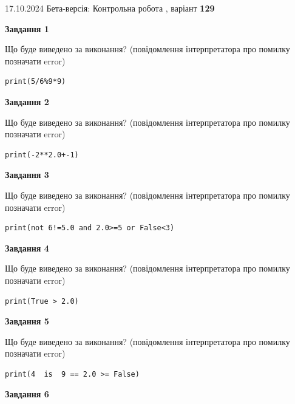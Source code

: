 \documentclass[12pt, ukrainian]{article}
\begin{document}
{\Large{17.10.2024 Бета-версія: Контрольна робота , варіант  \No \textbf { 129 }\par}}
{
\begin {large}
{\begin {center}\textbf{Завдання 1}\end {center}}

Що буде виведено за виконання? (повідомлення інтерпретатора про помилку позначати error)\par
\begin{verbatim}
print(5/6%9*9)
\end{verbatim}

{\begin {center}\textbf{Завдання 2}\end {center}}

Що буде виведено за виконання? (повідомлення інтерпретатора про помилку позначати error)\par
\begin{verbatim}
print(-2**2.0+-1)
\end{verbatim}

{\begin {center}\textbf{Завдання 3}\end {center}}

Що буде виведено за виконання? (повідомлення інтерпретатора про помилку позначати error)\par
\begin{verbatim}
print(not 6!=5.0 and 2.0>=5 or False<3)
\end{verbatim}

{\begin {center}\textbf{Завдання 4}\end {center}}

Що буде виведено за виконання? (повідомлення інтерпретатора про помилку позначати error)\par
\begin{verbatim}
print(True > 2.0)
\end{verbatim}

{\begin {center}\textbf{Завдання 5}\end {center}}

Що буде виведено за виконання? (повідомлення інтерпретатора про помилку позначати error)\par
\begin{verbatim}
print(4  is  9 == 2.0 >= False)
\end{verbatim}

{\begin {center}\textbf{Завдання 6}\end {center}}


\end{large}}
\end{document}
